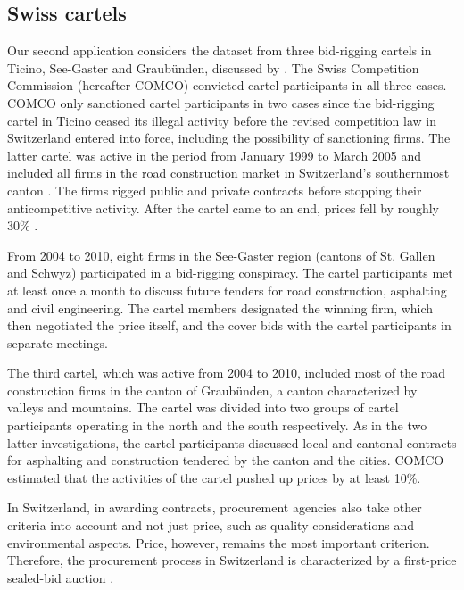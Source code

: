 \documentclass[a4paper,11pt]{article}
\begin{document}
	\subsection{Swiss cartels}
	
	Our second application considers the dataset from three bid-rigging cartels in Ticino, See-Gaster and Graubünden, discussed by \cite{wallimann2020machine}. The Swiss Competition Commission (hereafter COMCO) convicted cartel participants in all three cases. COMCO only sanctioned cartel participants in two cases since the bid-rigging cartel in Ticino ceased its illegal activity before the revised competition law in Switzerland entered into force, including the possibility of sanctioning firms. The latter cartel was active in the period from January 1999 to March 2005 and included all firms in the road construction market in Switzerland’s southernmost canton \citep[see also][]{imhof2019detecting}. The firms rigged public and private contracts before stopping their anticompetitive activity. After the cartel came to an end, prices fell by roughly 30\% \citep[][]{imhof2019detecting}.
	
	From 2004 to 2010, eight firms in the See-Gaster region (cantons of St. Gallen and Schwyz) participated in a bid-rigging conspiracy. The cartel participants met at least once a month to discuss future tenders for road construction, asphalting and civil engineering. The cartel members designated the winning firm, which then negotiated the price itself, and the cover bids with the cartel participants in separate meetings.
	
	The third cartel, which was active from 2004 to 2010, included most of the road construction firms in the canton of Graubünden, a canton characterized by valleys and mountains. The cartel was divided into two groups of cartel participants operating in the north and the south respectively. As in the two latter investigations, the cartel participants discussed local and cantonal contracts for asphalting and construction tendered by the canton and the cities. COMCO estimated that the activities of the cartel pushed up prices by at least 10\%.
	
	In Switzerland, in awarding contracts, procurement agencies also take other criteria into account and not just price, such as quality considerations and environmental aspects. Price, however, remains the most important criterion. Therefore, the procurement process in Switzerland is characterized by a first-price sealed-bid auction \citep[for further explanations, see][]{wallimann2020machine}. 
	
\end{document}
